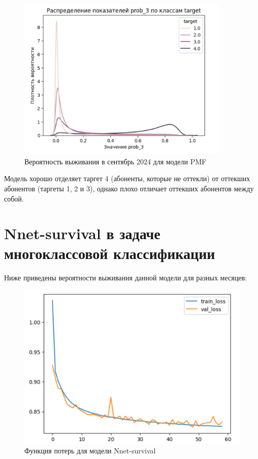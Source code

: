 \documentclass[a4paper,14pt,oneside,openany]{memoir}
\begin{document}
\begin{figure}[H]
	\includegraphics[width=0.9\textwidth]{../figures/prob_3_pmf.png}
	\caption{Вероятность выживания в сентябрь 2024 для модели PMF}
\end{figure}

Модель хорошо отделяет таргет 4 (абоненты, которые не оттекли) от оттекших абонентов (таргеты 1, 2 и 3), однако плохо отличает оттекших абонентов между собой. 

\section{Nnet-survival в задаче многоклассовой классификации}

Ниже приведены вероятности выживания данной модели для разных месяцев: 

\begin{figure}[H]
	\includegraphics[width=\textwidth]{../figures/nnet_losses_30_epoch.png}
	\caption{Функция потерь для модели Nnet-survival}
\end{figure}
\end{document}
